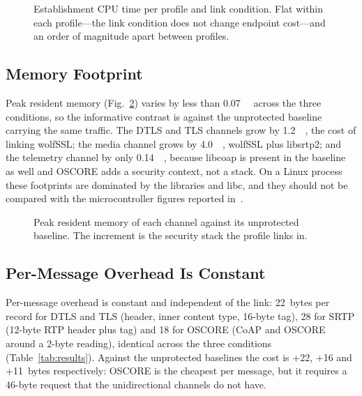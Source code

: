 \documentclass[conference]{IEEEtran}
\begin{document}
\begin{figure}[t]
\centering

\caption{Establishment CPU time per profile and link condition. Flat within
each profile---the link condition does not change endpoint cost---and an order
of magnitude apart between profiles.}
\label{fig:cpu}
\end{figure}

\subsection{Memory Footprint}
Peak resident memory (Fig.~\ref{fig:memory}) varies by less than
\SI{0.07}{\mega\byte} across the three conditions, so the informative contrast
is against the unprotected baseline carrying the same traffic. The DTLS and
TLS channels grow by \SI{1.2}{\mega\byte}, the cost of linking wolfSSL; the
media channel grows by \SI{4.0}{\mega\byte}, wolfSSL plus libsrtp2; and the
telemetry channel by only \SI{0.14}{\mega\byte}, because libcoap is present in
the baseline as well and OSCORE adds a security context, not a stack. On a
Linux process these footprints are dominated by the libraries and libc, and
they should not be compared with the microcontroller figures reported
in~\cite{restuccia2020,gunnarsson2021}.

\begin{figure}[t]
\centering

\caption{Peak resident memory of each channel against its unprotected
baseline. The increment is the security stack the profile links in.}
\label{fig:memory}
\end{figure}

\subsection{Per-Message Overhead Is Constant}
Per-message overhead is constant and independent of the link: 22~bytes per
record for DTLS and TLS (header, inner content type, 16-byte tag), 28 for SRTP
(12-byte RTP header plus tag) and 18 for OSCORE (CoAP and OSCORE around a
2-byte reading), identical across the three conditions
(Table~\ref{tab:results}). Against the unprotected baselines the cost is +22,
+16 and +11~bytes respectively: OSCORE is the cheapest per message, but it
requires a 46-byte request that the unidirectional channels do not have.
\end{document}
